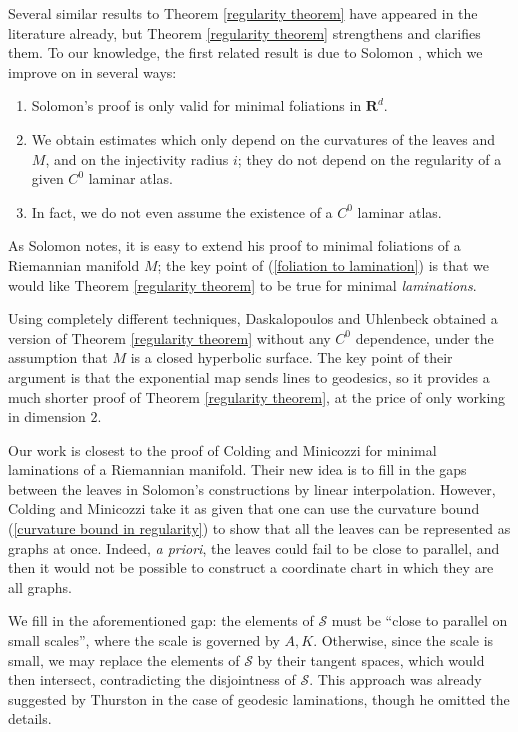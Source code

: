 \documentclass[reqno,11pt]{amsart}
\newcommand{\RR}{\mathbf{R}}
\theoremstyle{definition}
\numberwithin{equation}{section}
\begin{document}
Several similar results to Theorem \ref{regularity theorem} have appeared in the literature already, but Theorem \ref{regularity theorem} strengthens and clarifies them.
To our knowledge, the first related result is due to Solomon \cite[Theorem 1.1]{Solomon86}, which we improve on in several ways:
\begin{enumerate}
\item \label{foliation to lamination} Solomon's proof is only valid for minimal foliations in $\RR^d$.
\item We obtain estimates which only depend on the curvatures of the leaves and $M$, and on the injectivity radius $i$; they do not depend on the regularity of a given $C^0$ laminar atlas.
\item In fact, we do not even assume the existence of a $C^0$ laminar atlas.
\end{enumerate}
As Solomon notes, it is easy to extend his proof to minimal foliations of a Riemannian manifold $M$; the key point of (\ref{foliation to lamination}) is that we would like Theorem \ref{regularity theorem} to be true for minimal \emph{laminations}.

Using completely different techniques, Daskalopoulos and Uhlenbeck \cite[Proposition 7.3]{daskalopoulos2020transverse} obtained a version of Theorem \ref{regularity theorem} without any $C^0$ dependence, under the assumption that $M$ is a closed hyperbolic surface.
The key point of their argument is that the exponential map sends lines to geodesics, so it provides a much shorter proof of Theorem \ref{regularity theorem}, at the price of only working in dimension $2$.

Our work is closest to the proof of Colding and Minicozzi \cite[Appendix B]{ColdingMinicozziIV} for minimal laminations of a Riemannian manifold.
Their new idea is to fill in the gaps between the leaves in Solomon's constructions by linear interpolation.
However, Colding and Minicozzi take it as given that one can use the curvature bound (\ref{curvature bound in regularity}) to show that all the leaves can be represented as graphs at once.
Indeed, \emph {a priori}, the leaves could fail to be close to parallel, and then it would not be possible to construct a coordinate chart in which they are all graphs.

We fill in the aforementioned gap: the elements of $\mathcal S$ must be ``close to parallel on small scales'', where the scale is governed by $A, K$.
Otherwise, since the scale is small, we may replace the elements of $\mathcal S$ by their tangent spaces, which would then intersect, contradicting the disjointness of $\mathcal S$.
This approach was already suggested by Thurston \cite[\S8.5]{thurston1979geometry} in the case of geodesic laminations, though he omitted the details. 
\end{document}
